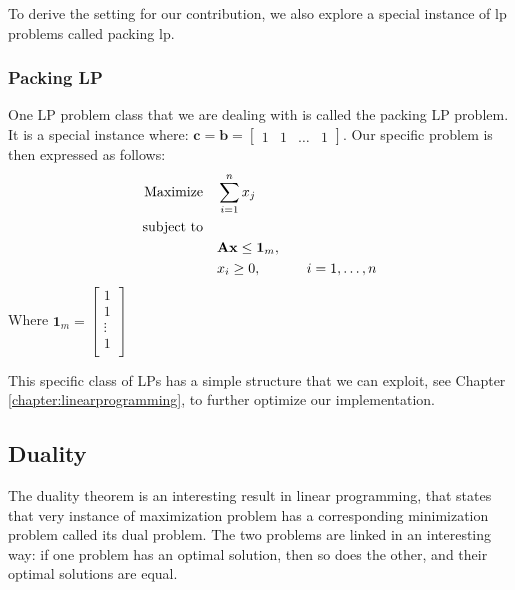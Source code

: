 To derive the setting for our contribution,
we also explore a special instance of \gls{lp} problems called packing \gls{lp}.
\subsubsection{Packing LP}
One LP problem class that we are dealing with is called the packing LP problem. It is a special instance where:
\( \mathbf{c}  = \mathbf{b} =  \begin{bmatrix}
    1 & 1 & \dots & 1
\end{bmatrix} \).
Our specific problem is then expressed as follows:
\begin{align}
    \text{Maximize} \quad   & \sum_{i=1}^{n} x_j \notag                                                             \\
    \text{subject to} \quad & \notag                                                                                \\
                            & \mathbf{A} \mathbf{x} \leq \mathbf{1}_m, \quad                                        \\
                            & x_i \geq 0, \quad                              & i = 1, \ldots, n \label{PLP_Problem}
\end{align}
Where $\mathbf{1}_m = \begin{bmatrix}
        1      \\
        1      \\
        \vdots \\
        1      \\
    \end{bmatrix}$


This specific class of LPs has a simple structure that we can exploit, see
Chapter \ref*{chapter:linearprogramming},
to further optimize our implementation.

\subsection{Duality}\label{duality}

The duality theorem is an interesting result in linear programming, that
states that very instance of maximization problem has a corresponding
minimization problem called its dual problem.
The two problems are linked in an interesting way:
if one problem has an optimal solution, then so does the other,
and their optimal solutions are equal.

